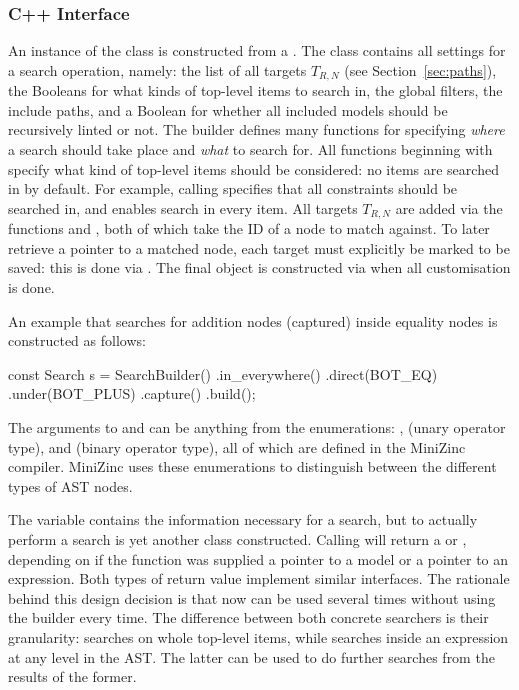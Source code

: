\documentclass[a4paper,12pt]{article}
\begin{document}
\subsubsection{C++ Interface}\label{sec:searcher:cpp}
\sloppy %

An instance of the  class is constructed from a . The
 class contains all settings for a search operation, namely: the list of all
targets $T_{R,N}$ (see Section~\ref{sec:paths}), the Booleans for what kinds of top-level items to search in, the global filters,
the include paths, and a Boolean for whether all included models should be recursively linted or not.
The builder defines many functions for specifying \emph{where} a search should take place and
\emph{what} to search for. All functions beginning with  specify what kind of
top-level items should be considered: no items are searched in by default. For example, calling
 specifies that all constraints should be searched in, and
 enables search in every item.
All targets $T_{R,N}$ are added via the functions  and , both of
which take the ID of a node to match against. To later
retrieve a pointer to a matched node, each target must explicitly be marked to
be saved: this is done via .
The final object is constructed via  when all customisation is done.

An example that searches for addition nodes (captured) inside equality nodes is constructed as follows:
\begin{cppp}[style=nonumbers]
const Search s = SearchBuilder()
  .in_everywhere()
  .direct(BOT_EQ)
  .under(BOT_PLUS)
  .capture()
  .build();
\end{cppp}
The arguments to  and  can be anything from the enumerations: ,
 (unary operator type), and  (binary operator type), all of which are
defined in the MiniZinc compiler. MiniZinc uses these enumerations to distinguish between the different types
of AST nodes.

The variable  contains the information necessary for a search, but to actually
perform a search is yet another class constructed. Calling  will return a
 or , depending on if the function was supplied
a pointer to a model or a pointer to an expression. Both types of return value implement
similar interfaces.
The rationale behind this design
decision is that  now can be used several times
without using the builder every time.
The difference between both concrete searchers is their granularity: 
searches on whole top-level items, while  searches inside an
expression at any level in the AST. The latter can be used to do further searches from
the results of the former.
\end{document}
